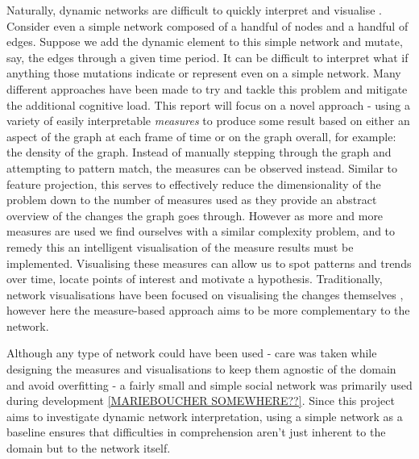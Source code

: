 Naturally, dynamic networks are difficult to quickly interpret and visualise \cite{iddps}. Consider even a simple network composed of a handful of nodes and a handful of edges. Suppose we add the dynamic element to this simple network and mutate, say, the edges through a given time period. It can be difficult to interpret what if anything those mutations indicate or represent even on a simple network. Many different approaches have been made to try and tackle this problem and mitigate the additional cognitive load. This report will focus on a novel approach - using a variety of easily interpretable \textit{measures} to produce some result based on either an aspect of the graph at each frame of time or on the graph overall, for example: the density of the graph. Instead of manually stepping through the graph and attempting to pattern match, the measures can be observed instead. Similar to feature projection, this serves to effectively reduce the dimensionality \cite{wikidimred} of the problem down to the number of measures used as they provide an abstract overview of the changes the graph goes through. However as more and more measures are used we find ourselves with a similar complexity problem, and to remedy this an intelligent visualisation of the measure results must be implemented. Visualising these measures can allow us to spot patterns and trends over time, locate points of interest and motivate a hypothesis. Traditionally, network visualisations have been focused on visualising the changes themselves \cite{tsotaivg}, however here the measure-based approach aims to be more complementary to the network.

Although any type of network could have been used - care was taken while designing the measures and visualisations to keep them agnostic of the domain and avoid overfitting - a fairly small and simple social network was primarily used during development \ref{MARIEBOUCHER SOMEWHERE??}. 
Since this project aims to investigate dynamic network interpretation, using a simple network as a baseline ensures that difficulties in comprehension aren’t just inherent to the domain but to the network itself. 

